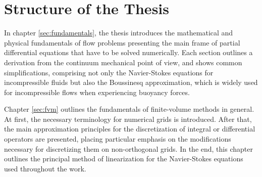 \section{Structure of the Thesis}

In chapter \ref{sec:fundamentals}, the thesis introduces the mathematical and physical fundamentals of flow problems presenting the main frame of partial differential equations that have to be solved numerically. Each section outlines a derivation from the continuum mechanical point of view, and shows common simplifications, comprising not only the Navier-Stokes equations for incompressible fluids but also the Boussinesq approximation, which is widely used for incompressible flows when experiencing buoyancy forces.

Chapter \ref{sec:fvm} outlines the fundamentals of finite-volume methods in general. At first, the necessary terminology for numerical grids is introduced. After that, the main approximation principles for the discretization of integral or differential operators are presented, placing particular emphasis on the modifications necessary for discretizing them on non-orthogonal grids. In the end, this chapter outlines the principal method of linearization for the Navier-Stokes equations used throughout the work.

